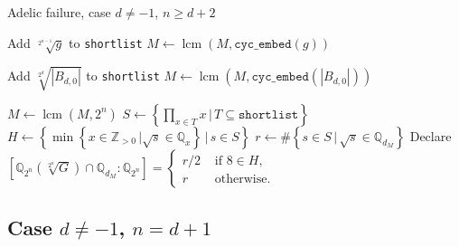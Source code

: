 \documentclass[10pt,a4paper]{article}
\DeclareMathOperator{\lcm}{lcm}
\theoremstyle{definition}
\begin{document}
\begin{algorithm}
\caption{Adelic failure, case $d\neq -1$, $n\geq d+2$}
\begin{algorithmic}
\State Add $\sqrt[2^{n-1}]{g}$ to \texttt{shortlist}
\State $M\leftarrow\lcm(M,\texttt{cyc\_embed}(g))$
\EndFor
\EndIf
\State

\State Add $\sqrt[2^{d}]{|B_{d,0}|}$ to \texttt{shortlist}
\State $M\leftarrow\lcm(M,\texttt{cyc\_embed}(|B_{d,0}|))$
\EndIf

\State
\State $M\leftarrow\lcm(M,2^{n})$
\State
{}
\State $S\leftarrow\left\{\prod_{x\in T}x\,|\,T\subseteq\texttt{shortlist}\right\}$
\State $H\leftarrow\left\{\min\left\{x\in\mathbb{Z}_{>0}\,|\sqrt{s}\in \mathbb{Q}_x\right\}\,|\,s\in S\right\}$
\State $r\leftarrow\# \left\{s\in S\,|\, \sqrt{s}\in\mathbb{Q}_{d_M}\right\}$
\State Declare $\left[\mathbb{Q}_{2^n}\left(\sqrt[2^n]{G}\right)\cap \mathbb{Q}_{d_M}:\mathbb{Q}_{2^n}\right]=\begin{cases}
r/2&\text{ if }8\in H,\\
r&\text{ otherwise}.
\end{cases}$
\EndFor
\end{algorithmic}

\end{algorithm}

\pagebreak

\subsection{Case $d\neq -1$, $n= d+1$}
\end{document}

